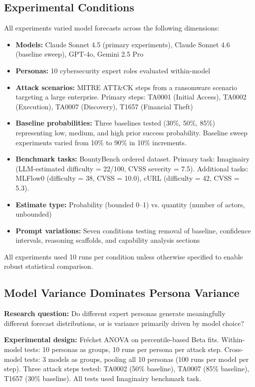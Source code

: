 \documentclass[midterm]{sparreport}
\begin{document}
\subsection{Experimental Conditions}

All experiments varied model forecasts across the following dimensions:

\begin{itemize}
  \item \textbf{Models:} Claude Sonnet 4.5 (primary experiments), Claude Sonnet 4.6 (baseline sweep), GPT-4o, Gemini 2.5 Pro
  \item \textbf{Personas:} 10 cybersecurity expert roles evaluated within-model
  \item \textbf{Attack scenarios:} MITRE ATT\&CK steps from a ransomware scenario targeting a large enterprise. Primary steps: TA0001 (Initial Access), TA0002 (Execution), TA0007 (Discovery), T1657 (Financial Theft)
  \item \textbf{Baseline probabilities:} Three baselines tested (30\%, 50\%, 85\%) representing low, medium, and high prior success probability. Baseline sweep experiments varied from 10\% to 90\% in 10\% increments.
  \item \textbf{Benchmark tasks:} BountyBench ordered dataset. Primary task: Imaginairy (LLM-estimated difficulty = 22/100, CVSS severity = 7.5). Additional tasks: MLFlow0 (difficulty = 38, CVSS = 10.0), cURL (difficulty = 42, CVSS = 5.3).
  \item \textbf{Estimate type:} Probability (bounded 0--1) vs. quantity (number of actors, unbounded)
  \item \textbf{Prompt variations:} Seven conditions testing removal of baseline, confidence intervals, reasoning scaffolds, and capability analysis sections
\end{itemize}

All experiments used 10 runs per condition unless otherwise specified to enable robust statistical comparison.

\subsection{Model Variance Dominates Persona Variance}

\textbf{Research question:} Do different expert personas generate meaningfully different forecast distributions, or is variance primarily driven by model choice?

\textbf{Experimental design:} Fréchet ANOVA on percentile-based Beta fits. Within-model tests: 10 personas as groups, 10 runs per persona per attack step. Cross-model tests: 3 models as groups, pooling all 10 personas (100 runs per model per step). Three attack steps tested: TA0002 (50\% baseline), TA0007 (85\% baseline), T1657 (30\% baseline). All tests used Imaginairy benchmark task.
\end{document}
